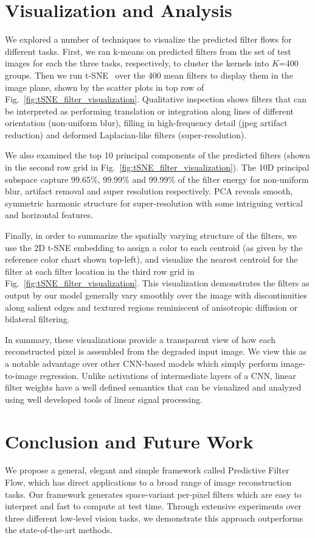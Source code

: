 \documentclass[10pt,twocolumn,letterpaper]{article}
\begin{document}
\section{Visualization and Analysis}
We explored a number of techniques to visualize the predicted filter flows for
different tasks.  First, we ran k-means on predicted filters from the set of
test images for each the three tasks, respectively, to cluster the kernels into
$K$=400 groups.  Then we run t-SNE~\cite{maaten2008visualizing} over the 400
mean filters to display them in the image plane, shown by the scatter plots in
top row of Fig.~\ref{fig:tSNE_filter_visualization}.  Qualitative inspection
shows filters that can be interpreted as performing translation or integration
along lines of different orientation (non-uniform blur),  filling in
high-frequency detail (jpeg artifact reduction) and deformed Laplacian-like
filters (super-resolution).

We also examined the top 10 principal components of the predicted filters
(shown in the second row grid in Fig.~\ref{fig:tSNE_filter_visualization}).
The 10D principal subspace capture 99.65\%, 99.99\% and 99.99\% of the filter energy
for non-uniform blur, artifact removal and super resolution respectively.  PCA
reveals smooth, symmetric harmonic structure for super-resolution with some
intriguing vertical and horizontal features.

Finally, in order to summarize the spatially varying structure of the filters,
we use the 2D t-SNE embedding to assign a color to each centroid (as given by
the reference color chart shown top-left), and visualize the nearest centroid
for the filter at each filter location in the third row grid in
Fig.~\ref{fig:tSNE_filter_visualization}.  This visualization demonstrates
the filters as output by our model generally vary smoothly over the image
with discontinuities along salient edges and textured regions reminiscent
of anisotropic diffusion or bilateral filtering.

In summary, these visualizations provide a transparent view of how each
reconstructed pixel is assembled from the degraded input image.  We view this
as a notable advantage over other CNN-based models which simply perform
image-to-image regression. Unlike activations of intermediate layers of a CNN,
linear filter weights have a well defined semantics that can be visualized and
analyzed using well developed tools of linear signal processing.

\section{Conclusion and Future Work}
We propose a general, elegant and simple framework called Predictive Filter
Flow, which has direct applications to a broad range of image reconstruction
tasks.  Our framework generates space-variant per-pixel filters which are easy
to interpret and fast to compute at test time.  Through extensive experiments
over three different low-level vision tasks, we demonstrate this approach
outperforms the state-of-the-art methods.
\end{document}
